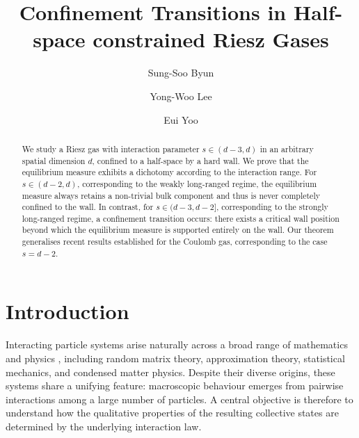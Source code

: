 \documentclass{amsart}
\theoremstyle{plain}
\theoremstyle{remark}
\numberwithin{equation}{section}
\begin{document}
\title[Half-space constrained Riesz gas]{%
Confinement Transitions in Half-space constrained Riesz Gases}
 

\author{Sung-Soo Byun}
\address{Department of Mathematical Sciences and Research Institute of Mathematics, Seoul National University, Seoul 08826, Republic of Korea}

\author{Yong-Woo Lee}
\address{Department of Mathematical Sciences, Seoul National University, Seoul 08826, Republic of Korea}

\author{Eui Yoo}
\address{Department of Mathematical Sciences, Seoul National University, Seoul 08826, Republic of Korea}

\begin{abstract} 
We study a Riesz gas with interaction parameter $s \in (d-3,d)$ in an arbitrary spatial dimension $d$, confined to a half-space by a hard wall. We prove that the equilibrium measure exhibits a dichotomy according to the interaction range. For $s \in (d-2,d)$, corresponding to the weakly long-ranged regime, the equilibrium measure always retains a non-trivial bulk component and thus is never completely confined to the wall. In contrast, for $s \in (d-3,d-2]$, corresponding to the strongly long-ranged regime, a confinement transition occurs: there exists a critical wall position beyond which the equilibrium measure is supported entirely on the wall. Our theorem generalises recent results established for the Coulomb gas, corresponding to the case $s=d-2$.
\end{abstract}


\maketitle


\section{Introduction}

Interacting particle systems arise naturally across a broad range of mathematics and physics \cite{CDFR14,ST97,Fo10}, including random matrix theory, approximation theory, statistical mechanics, and condensed matter physics. Despite their diverse origins, these systems share a unifying feature: macroscopic behaviour emerges from pairwise interactions among a large number of particles. A central objective is therefore to understand how the qualitative properties of the resulting collective states are determined by the underlying interaction law.
\end{document}
